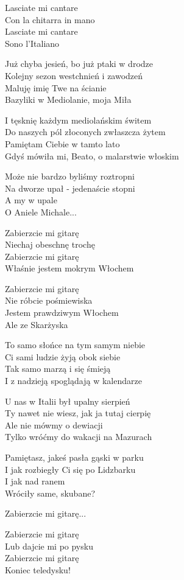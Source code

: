 \begin{text}
\vin Lasciate mi cantare\\
\vin Con la chitarra in mano\\
\vin Lasciate mi cantare\\
\vin Sono l'Italiano

Już chyba jesień, bo już ptaki w drodze\\
Kolejny sezon westchnień i zawodzeń\\
Maluję imię Twe na ścianie\\
Bazyliki w Mediolanie, moja Miła

I tęsknię każdym mediolańskim świtem\\
Do naszych pól złoconych zwłaszcza żytem\\
Pamiętam Ciebie w tamto lato\\
Gdyś mówiła mi, Beato, o malarstwie włoskim

Może nie bardzo byliśmy roztropni\\
Na dworze upał - jedenaście stopni\\
A my w upale \\
O Aniele Michale...

\vin Zabierzcie mi gitarę\\
\vin Niechaj obeschnę trochę\\
\vin Zabierzcie mi gitarę\\
\vin Właśnie jestem mokrym Włochem

\vin Zabierzcie mi gitarę\\
\vin Nie róbcie pośmiewiska\\
\vin Jestem prawdziwym Włochem\\
\vin Ale ze Skarżyska

To samo słońce na tym samym niebie\\
Ci sami ludzie żyją obok siebie\\
Tak samo marzą i się śmieją\\
I z nadzieją spoglądają w kalendarze

U nas w Italii był upalny sierpień\\
Ty nawet nie wiesz, jak ja tutaj cierpię\\
Ale nie mówmy o dewiacji\\
Tylko wróćmy do wakacji na Mazurach

Pamiętasz, jakeś pasła gąski w parku\\
I jak rozbiegły Ci się po Lidzbarku\\
I jak nad ranem\\
Wróciły same, skubane?

\vin Zabierzcie mi gitarę...

\vin Zabierzcie mi gitarę\\
\vin Lub dajcie mi po pysku\\
\vin Zabierzcie mi gitarę\\
\vin Koniec teledysku!
\end{text}
